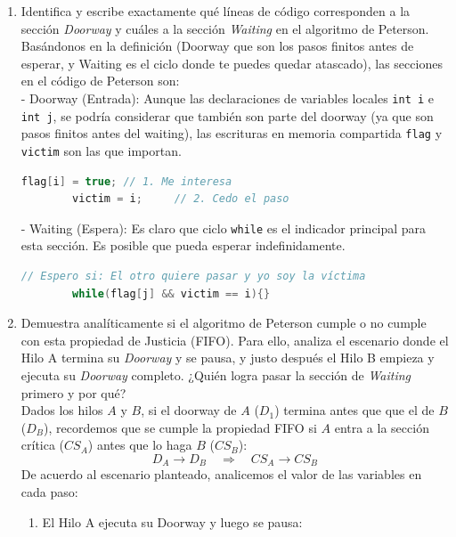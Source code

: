     \begin{enumerate}
        \item \textcolor{dkgreen}{Identifica y escribe exactamente qué líneas de código corresponden a la sección \textit{Doorway} y cuáles a la sección \textit{Waiting} en el algoritmo de Peterson.}\\
        Basándonos en la definición (Doorway que son los pasos finitos antes de esperar, y Waiting es el ciclo donde te puedes quedar atascado), las secciones en el código de Peterson son: \\
        - Doorway (Entrada): Aunque las declaraciones de variables locales \texttt{int i} e \texttt{int j}, se podría considerar que también son parte del doorway (ya que son pasos finitos antes del waiting),  las escrituras en memoria compartida \texttt{flag} y \texttt{victim} son las que importan.
        \begin{lstlisting}[language=Java]
        flag[i] = true; // 1. Me interesa
        victim = i;     // 2. Cedo el paso\end{lstlisting}
        - Waiting (Espera): Es claro que ciclo \texttt{while} es el indicador principal para esta sección. Es posible que pueda esperar indefinidamente.
        \begin{lstlisting}[language=Java]
        // Espero si: El otro quiere pasar y yo soy la víctima
        while(flag[j] && victim == i){}\end{lstlisting}
        \item \textcolor{dkgreen}{Demuestra analíticamente si el algoritmo de Peterson cumple o no cumple con esta propiedad de Justicia (FIFO). Para ello, analiza el escenario donde el Hilo A termina su \textit{Doorway} y se pausa, y justo después el Hilo B empieza y ejecuta su \textit{Doorway} completo. ¿Quién logra pasar la sección de \textit{Waiting} primero y por qué?}\\
        Dados los hilos $A$ y $B$, si el doorway de $A$ ($D_1$) termina antes que que el de $B$ ($D_B$), recordemos que se cumple la propiedad FIFO si $A$ entra a la sección crítica ($CS_A$) antes que lo haga $B$ ($CS_B$):
        \begin{equation}
            D_A \rightarrow D_B \quad \Longrightarrow \quad CS_A \rightarrow CS_B
        \end{equation}
        De acuerdo al escenario planteado, analicemos el valor de las variables en cada paso:
        \begin{enumerate}
            \item El Hilo A ejecuta su Doorway y luego se pausa:

\end{enumerate}
\end{enumerate}

